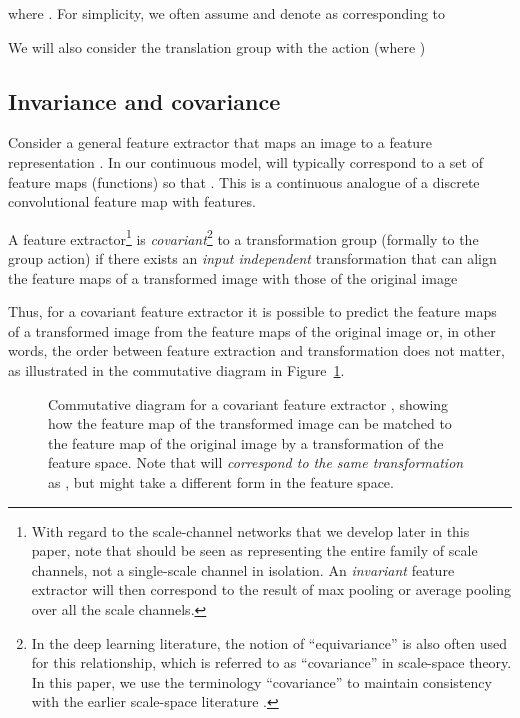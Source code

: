 \documentclass[twocolumn,runningheads]{svjour3}
\begin{document}
where . For simplicity, we often assume   and denote  as  corresponding to 

We will also consider the translation group with the action (where )


\subsection{Invariance and covariance}

Consider a general feature extractor  
that maps an image  to a feature representation . 
In our continuous model,  will typically correspond to a 
set of   feature maps (functions) so that .
This is a continuous analogue of a discrete convolutional feature map with  features.

A feature extractor\footnote{With regard to the scale-channel networks
  that we develop later in this paper, note that  should be seen as representing the entire family
of scale channels, not a
single-scale channel in isolation. An {\em invariant\/} feature
extractor  will then correspond to the result of
max pooling or average pooling over all the scale channels.}
 is {\em covariant\/}\footnote{In the deep learning literature, the notion of
  ``equivariance'' is also often used for this relationship, which is
  referred to as ``covariance'' in scale-space theory. In this paper,
  we use the terminology ``covariance'' to maintain consistency with
  the earlier scale-space literature \cite{Lin13-ImPhys}.}
to a transformation
group  (formally to the group action) if there exists an
{\em input independent\/} transformation  that can
align the feature maps of a transformed image with those of the
original image

Thus, for a covariant feature extractor it is possible to predict the
feature maps of a transformed image from the feature maps of the
original image or, in other words, the order between feature extraction and transformation does not matter, as illustrated in the commutative diagram in 
Figure~\ref{fig-comm-diag}.

\begin{figure}[hbt]
  
 \caption{Commutative diagram for a covariant feature extractor
  , showing how the feature map of the transformed image can be matched to the feature map of the original image by a transformation of the feature space. Note that  will \emph{correspond to the same transformation} as , but might take a different form in the feature space.
}
\label{fig-comm-diag}
\end{figure}
\end{document}
